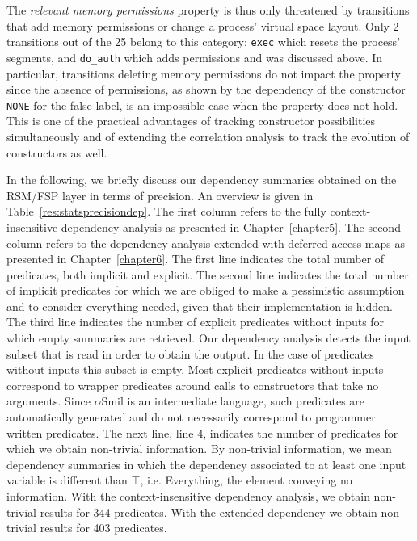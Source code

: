 \documentclass[11pt]{article}
\newcommand{\disp}[1]{\lstinline&#1&}
\def\asmil{\textsf{$\alpha$Smil}}
\begin{document}
The \emph{relevant memory permissions} property is thus only threatened by 
transitions that add memory permissions or change a process' virtual space 
layout. Only 2 transitions out of the 25 belong to this category: 
{\disp{exec}} which resets the process' segments, and {\disp{do_auth}} 
which adds permissions and was discussed above. In particular, transitions 
deleting memory permissions 
do not impact the property since the absence of permissions, as shown by the 
dependency of the constructor {\disp{NONE}} for the \textsf{false} label, is 
an impossible case when the property does not hold. This is one of the practical 
advantages of tracking constructor possibilities simultaneously and of extending
the correlation analysis to track the evolution of constructors as well. 
   
In the following, we briefly discuss our dependency summaries obtained on the 
RSM/FSP layer in terms of precision. 
An overview is given in Table~\ref{res:statsprecisiondep}. The first column 
refers to the fully context-insensitive dependency analysis as presented in
Chapter~\ref{chapter5}. The second column refers to the dependency analysis
extended with deferred access maps as presented in Chapter~\ref{chapter6}.
The first line indicates the total number of predicates, both implicit and 
explicit. The second line indicates the total number of implicit predicates
for which we are obliged to make a pessimistic assumption and to consider
everything needed, given that their implementation is hidden. The third line
indicates the number of explicit predicates without inputs for which empty 
summaries are retrieved. Our dependency analysis detects the input subset that
is read in order to obtain the output. In the case of predicates without inputs
this subset is empty. Most explicit predicates without inputs correspond to 
wrapper predicates around calls to constructors that take no arguments. Since 
{\asmil} is an intermediate language, such predicates are automatically generated
and do not necessarily correspond to programmer written predicates.
The next line, line 4, indicates the number of predicates for which we obtain
non-trivial information. By non-trivial information, we mean dependency summaries 
in which the dependency associated to at least one input variable is different
than $\top$, i.e. \textsf{Everything}, the element conveying no information. 
With the context-insensitive dependency analysis, we obtain non-trivial results
for 344 predicates. With the extended dependency we obtain non-trivial results
for 403 predicates.  
\end{document}
